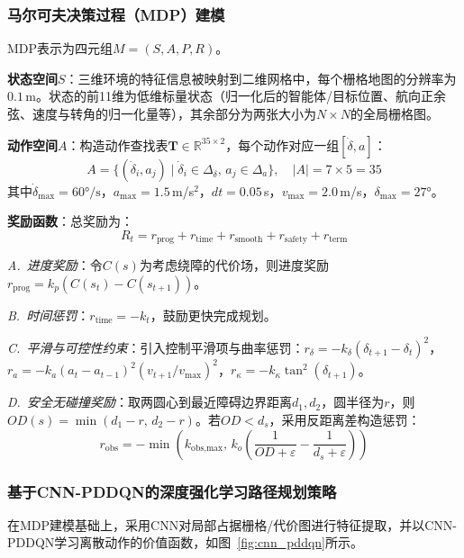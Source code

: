\documentclass{iopjournal}
\begin{document}
\subsubsection{马尔可夫决策过程（MDP）建模}

MDP表示为四元组$M=(S,A,P,R)$。

\textbf{状态空间}$S$：三维环境的特征信息被映射到二维网格中，每个栅格地图的分辨率为$0.1$\,m。状态的前11维为低维标量状态（归一化后的智能体/目标位置、航向正余弦、速度与转角的归一化量等），其余部分为两张大小为$N\times N$的全局栅格图。

\textbf{动作空间}$A$：构造动作查找表$\mathbf{T}\in\mathbb{R}^{35\times2}$，每个动作对应一组$[\dot{\delta}, a]$：
\begin{equation}
  A = \{(\dot{\delta}_i, a_j) \mid \dot{\delta}_i\in\Delta_{\dot{\delta}},\, a_j\in\Delta_a\},\quad |A|=7\times5=35
\end{equation}
其中$\dot{\delta}_{\max}=60°/\text{s}$，$a_{\max}=1.5$\,m/s$^2$，$dt=0.05$\,s，$v_{\max}=2.0$\,m/s，$\delta_{\max}=27°$。

\textbf{奖励函数}：总奖励为：
\begin{equation}
  R_t = r_{\text{prog}} + r_{\text{time}} + r_{\text{smooth}} + r_{\text{safety}} + r_{\text{term}}
\end{equation}

\textit{A.~进度奖励}：令$C(s)$为考虑绕障的代价场，则进度奖励$r_{\text{prog}} = k_p(C(s_t) - C(s_{t+1}))$。

\textit{B.~时间惩罚}：$r_{\text{time}} = -k_t$，鼓励更快完成规划。

\textit{C.~平滑与可控性约束}：引入控制平滑项与曲率惩罚：$r_{\delta} = -k_{\delta}(\delta_{t+1}-\delta_t)^2$，$r_a = -k_a(a_t-a_{t-1})^2(v_{t+1}/v_{\max})^2$，$r_{\kappa} = -k_{\kappa}\tan^2(\delta_{t+1})$。

\textit{D.~安全无碰撞奖励}：取两圆心到最近障碍边界距离$d_1,d_2$，圆半径为$r$，则$OD(s)=\min(d_1-r,\,d_2-r)$。若$OD<d_s$，采用反距离差构造惩罚：
\begin{equation}
  r_{\text{obs}} = -\min\!\left(k_{\text{obs,max}},\, k_o\!\left(\frac{1}{OD+\varepsilon}-\frac{1}{d_s+\varepsilon}\right)\right)
\end{equation}

\subsubsection{基于CNN-PDDQN的深度强化学习路径规划策略}

在MDP建模基础上，采用CNN对局部占据栅格/代价图进行特征提取，并以CNN-PDDQN学习离散动作的价值函数，如图~\ref{fig:cnn_pddqn}所示。
\end{document}
